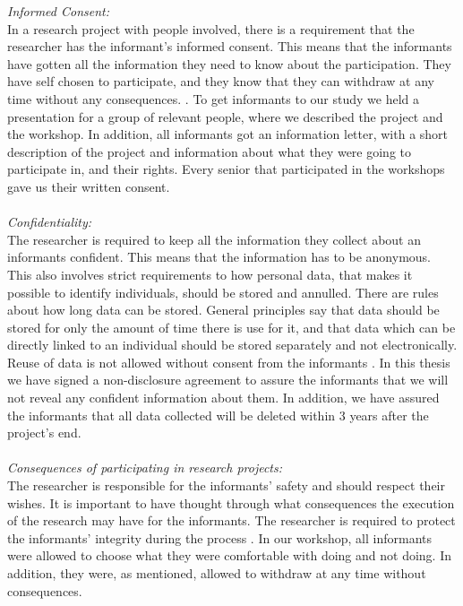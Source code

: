 \emph{Informed Consent:} \\
In a research project with people involved, there is a requirement that the researcher has the informant's informed consent. This means that the informants have gotten all the information they need to know about the participation. They have self chosen to participate, and they know that they can withdraw at any time without any consequences.  \cite{qualitative}. To get informants to our study we held a presentation for a group of relevant people, where we described the project and the workshop. In addition, all informants got an information letter, with a short description of the project and information about what they were going to participate in, and their rights. Every senior that participated in the workshops gave us their written consent.   \\ \\
\emph{Confidentiality:}\\
The researcher is required to keep all the information they collect about an informants confident. This means that the information has to be anonymous. This also involves strict requirements to how personal data, that makes it possible to identify individuals, should be stored and annulled. There are rules about how long data can be stored. General principles say that data should be stored for only the amount of time there is use for it, and that data which can be directly linked to an individual should be stored separately and not electronically. Reuse of data is not allowed without consent from the informants \cite{qualitative}. In this thesis we have signed a non-disclosure agreement to assure the informants that we will not reveal any confident information about them. In addition, we have assured the informants that all data collected will be deleted within 3 years after the project's end. \\ \\
\emph{Consequences of participating in research projects:}\\
The researcher is responsible for the informants' safety and should respect their wishes. It is important to have thought through what consequences the execution of the research may have for the informants. The researcher is required to protect the informants' integrity during the process \cite{qualitative}. In our workshop, all informants were allowed to choose what they were comfortable with doing and not doing. In addition, they were, as mentioned, allowed to withdraw at any time without consequences. \\ \\

